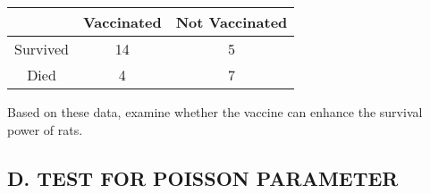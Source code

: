 \documentclass[11pt, a4paper]{article}
\begin{document}
\begin{enumerate}
\begin{table}[h]
\begin{center}
\begin{tabular}{|c|c|c|}
	\hline
	
	& Vaccinated & Not Vaccinated \\
	
	\hline
	
	Survived & 14 & 5 \\
	
	\hline
	
	Died & 4 & 7 \\
	
	\hline
	
	\end{tabular}
	\end{center}
	
	\end{table}
	
	Based on these data, examine whether the vaccine can enhance the survival power of rats.
	
	
	
	
	
	
	
	
	
	
	
	
	
	
	
	
	
	

\end{enumerate}



















\pagebreak

\begin{center}

\section*{D. TEST FOR POISSON PARAMETER}

\end{center}
\end{document}
